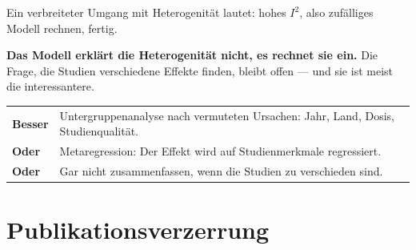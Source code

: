 \begin{warnung}
Ein verbreiteter Umgang mit Heterogenität lautet: hohes $I^2$, also zufälliges Modell rechnen, fertig.

\begin{center}
\begin{minipage}{0.9\textwidth}
\textbf{Das Modell erklärt die Heterogenität nicht, es rechnet sie ein.} Die Frage,  die Studien verschiedene Effekte finden, bleibt offen --- und sie ist meist die interessantere.
\end{minipage}
\end{center}

\begin{center}
\renewcommand{\arraystretch}{1.5}
\begin{tabular}{@{}P{2.6cm}P{6.0cm}@{}}
\toprule
\textbf{Besser} & Untergruppenanalyse nach vermuteten Ursachen: Jahr, Land, Dosis, Studienqualität.\\
\textbf{Oder} & Metaregression: Der Effekt wird auf Studienmerkmale regressiert.\\
\textbf{Oder} & Gar nicht zusammenfassen, wenn die Studien zu verschieden sind.\\
\bottomrule
\end{tabular}
\end{center}

\begin{center}
\begin{minipage}{0.88\textwidth}
\end{minipage}
\end{center}
\end{warnung}

\section{Publikationsverzerrung}

